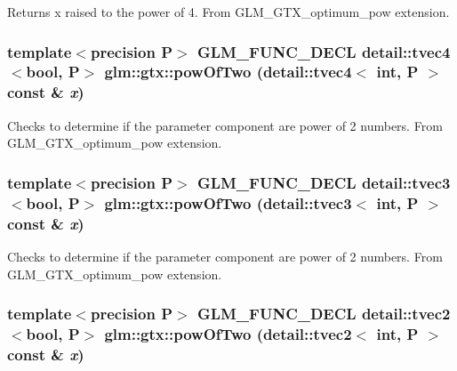 Returns x raised to the power of 4. From GLM\_\-GTX\_\-optimum\_\-pow extension. \hypertarget{group__gtx__optimum__pow_g6b8d2e72de216fdb517d7bcc9323a713}{
\subsubsection[powOfTwo]{\setlength{\rightskip}{0pt plus 5cm}template$<$precision P$>$ GLM\_\-FUNC\_\-DECL detail::tvec4$<$bool, P$>$ glm::gtx::powOfTwo (detail::tvec4$<$ int, P $>$ const \& {\em x})}}
\label{group__gtx__optimum__pow_g6b8d2e72de216fdb517d7bcc9323a713}


Checks to determine if the parameter component are power of 2 numbers. From GLM\_\-GTX\_\-optimum\_\-pow extension. \hypertarget{group__gtx__optimum__pow_g9225089c241c18df4ff3548949f8d223}{
\subsubsection[powOfTwo]{\setlength{\rightskip}{0pt plus 5cm}template$<$precision P$>$ GLM\_\-FUNC\_\-DECL detail::tvec3$<$bool, P$>$ glm::gtx::powOfTwo (detail::tvec3$<$ int, P $>$ const \& {\em x})}}
\label{group__gtx__optimum__pow_g9225089c241c18df4ff3548949f8d223}


Checks to determine if the parameter component are power of 2 numbers. From GLM\_\-GTX\_\-optimum\_\-pow extension. \hypertarget{group__gtx__optimum__pow_g9eb230332816fecf06fc3a6f01fcaffa}{
\subsubsection[powOfTwo]{\setlength{\rightskip}{0pt plus 5cm}template$<$precision P$>$ GLM\_\-FUNC\_\-DECL detail::tvec2$<$bool, P$>$ glm::gtx::powOfTwo (detail::tvec2$<$ int, P $>$ const \& {\em x})}}
\label{group__gtx__optimum__pow_g9eb230332816fecf06fc3a6f01fcaffa}


